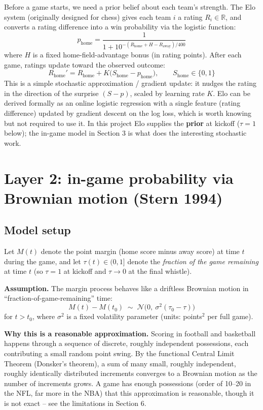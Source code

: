 \documentclass[11pt]{article}
\begin{document}
Before a game starts, we need a prior belief about each team's strength.
The Elo system (originally designed for chess) gives each team $i$ a
rating $R_i \in \mathbb{R}$, and converts a rating difference into a win
probability via the logistic function:
\[
p_{\text{home}} = \frac{1}{1 + 10^{-(R_{\text{home}} + H - R_{\text{away}})/400}}
\]
where $H$ is a fixed home-field-advantage bonus (in rating points). After
each game, ratings update toward the observed outcome:
\[
R_{\text{home}}' = R_{\text{home}} + K\big(S_{\text{home}} - p_{\text{home}}\big),
\qquad S_{\text{home}} \in \{0, 1\}
\]
This is a simple stochastic approximation / gradient update: it nudges the
rating in the direction of the surprise $(S - p)$, scaled by learning rate
$K$. Elo can be derived formally as an online logistic regression with a
single feature (rating difference) updated by gradient descent on the log
loss, which is worth knowing but not required to use it. In this project
Elo supplies the \textbf{prior} at kickoff ($\tau = 1$ below); the in-game
model in Section 3 is what does the interesting stochastic work.

\section{Layer 2: in-game probability via Brownian motion (Stern 1994)}

\subsection{Model setup}

Let $M(t)$ denote the point margin (home score minus away score) at time
$t$ during the game, and let $\tau(t) \in (0, 1]$ denote the \emph{fraction
of the game remaining} at time $t$ (so $\tau = 1$ at kickoff and $\tau \to
0$ at the final whistle).

\textbf{Assumption.} The margin process behaves like a driftless Brownian
motion in ``fraction-of-game-remaining'' time:
\[
M(t) - M(t_0) \;\sim\; \mathcal{N}\!\big(0,\ \sigma^2 (\tau_0 - \tau)\big)
\]
for $t > t_0$, where $\sigma^2$ is a fixed volatility parameter (units:
points$^2$ per full game).

\textbf{Why this is a reasonable approximation.} Scoring in football and
basketball happens through a sequence of discrete, roughly independent
possessions, each contributing a small random point swing. By the
functional Central Limit Theorem (Donsker's theorem), a sum of many small,
roughly independent, roughly identically distributed increments converges
to a Brownian motion as the number of increments grows. A game has enough
possessions (order of 10--20 in the NFL, far more in the NBA) that this
approximation is reasonable, though it is not exact -- see the limitations
in Section 6.
\end{document}
